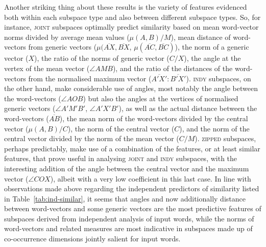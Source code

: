Another striking thing about these results is the variety of features evidenced both within each subspace type and also between different subspace types.  So, for instance, \textsc{joint} subspaces optimally predict similarity based on mean word-vector norms divided by average mean values ($\mu(A,B)/M$), mean distance of word-vectors from generic vectors ($\mu(\overline{AX},\overline{BX}$, $\mu(\overline{AC},\overline{BC})$), the norm of a generic vector ($X$), the ratio of the norms of generic vector ($C/X$), the angle at the vertex of the mean vector ($\angle AMB$), and the ratio of the distances of the word-vectors from the normalised maximum vector ($\overline{A'X'}:\overline{B'X'}$).  \textsc{indy} subspaces, on the other hand, make considerable use of angles, most notably the angle between the word-vectors ($\angle AOB$) but also the angles at the vertices of normalised generic vectors ($\angle A'M'B'$, $\angle A'X'B'$), as well as the actual distance between the word-vectors ($\overline{AB}$), the mean norm of the word-vectors divided by the central vector ($\mu (A,B)/C$), the norm of the central vector ($C$), and the norm of the central vector divided by the norm of the mean vector ($C/M$).  \textsc{zipped} subspaces, perhaps predictably, make use of a combination of the features, or at least similar features, that prove useful in analysing \textsc{joint} and \textsc{indy} subspaces, with the interesting addition of the angle between the central vector and the maximum vector ($\angle COX$), albeit with a very low coefficient in this last case.  In line with observations made above regarding the independent predictors of similarity listed in Table~\ref{tab:ind-similar}, it seems that angles and now additionally distance between word-vectors and some generic vectors are the most predictive features of subspaces derived from independent analysis of input words, while the norms of word-vectors and related measures are most indicative in subspaces made up of co-occurrence dimensions jointly salient for input words.

